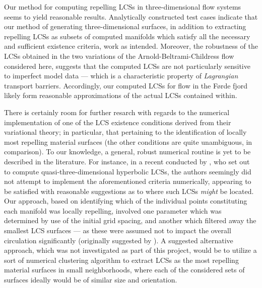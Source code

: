 Our method for computing repelling LCSs in three-dimensional flow systems
seems to yield reasonable results. Analytically constructed test cases indicate
that our method of generating three-dimensional surfaces, in addition to
extracting repelling LCSs as subsets of computed manifolds which satisfy all
the necessary and sufficient existence criteria, work as intended. Moreover,
the robustness of the LCSs obtained in the two variations of the
Arnold-Beltrami-Childress flow considered here, suggests that the computed LCSs
are not particularly sensitive to imperfect model data --- which is a
characteristic property of \emph{Lagrangian} transport barriers. Accordingly,
our computed LCSs for flow in the Førde fjord likely form reasonable
approximations of the actual LCSs contained within.

There is certainly room for further resarch with regards to the numerical
implementation of one of the LCS existence conditions derived from their
variational theory; in particular, that pertaining to the identification of
locally most repelling material surfaces (the other conditions are quite
unambiguous, in comparison). To our knowledge, a general, robust numerical
routine is yet to be described in the literature. For instance, in a recent
conducted by \textcite{oettinger2016autonomous}, who set out to compute
quasi-three-dimensional hyperbolic LCSs, the authors seemingly did not attempt
to implement the aforementioned criteria numerically, appearing to be satisfied
with reasonable suggestions as to where such LCSs \emph{might} be located. Our
approach, based on identifying which of the individual points constituting each
manifold was locally repelling, involved one parameter which was determined by
use of the  initial grid spacing, and another which filtered away the smallest
LCS  surfaces --- as these were assumed not to impact the overall circulation
significantly (originally suggested by \textcite{farazmand2012computing}).
A suggested alternative approach, which was not investigated as part of this
project, would be to utilize a sort of numerical clustering algorithm to
extract LCSs as the most repelling material surfaces in small neighborhoods,
where each of the considered sets of surfaces ideally would be of similar size
and orientation.

